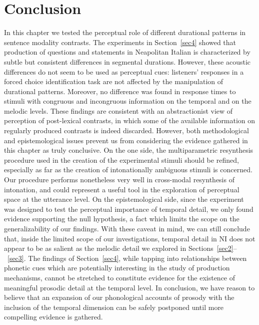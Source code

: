 \section{Conclusion}\label{sec55}
In this chapter we tested the perceptual role of different durational patterns in sentence modality contrasts. The experiments in Section~\ref{sec4} showed that production of questions and statements in Neapolitan Italian is characterized by subtle but consistent differences in segmental durations. However, these acoustic differences do not seem to be used as perceptual cues: listeners' responses in a forced choice identification task are not affected by the manipulation of durational patterns. Moreover, no difference was found in response times to stimuli with congruous and incongruous information on the temporal and on the melodic levels. These findings are consistent with an abstractionist view of perception of post-lexical contrasts, in which some of the available information on regularly produced contrasts is indeed discarded.
However, both methodological and epistemological issues prevent us from considering the evidence gathered in this chapter as truly conclusive. On the one side, the multiparametric resynthesis procedure used in the creation of the experimental stimuli should be refined, especially as far as the creation of intonationally ambiguous stimuli is concerned. Our procedure performs nonetheless very well in cross-modal resynthesis of intonation, and could represent a useful tool in the exploration of perceptual space at the utterance level. On the epistemological side, since the experiment was designed to test the perceptual importance of temporal detail, we only found evidence supporting the null hypothesis, a fact which limits the scope on the generalizability of our findings.
With these caveat in mind, we can still conclude that, inside the limited scope of our investigations, temporal detail in NI does not appear to be as salient as the melodic detail we explored in Sections~\ref{sec2}--~\ref{sec3}. The findings of Section~\ref{sec4}, while tapping into relationships between phonetic cues which are potentially interesting in the study of production mechanisms, cannot be stretched to constitute evidence for the existence of meaningful prosodic detail at the temporal level. In conclusion, we have reason to believe that an expansion of our phonological accounts of prosody with the inclusion of the temporal dimension can be safely postponed until more compelling evidence is gathered.
